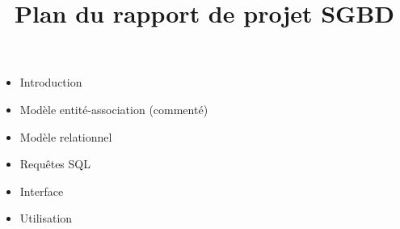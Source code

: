 \documentclass{article}
\title{Plan du rapport de projet SGBD}
\begin{document}
\maketitle
\begin{itemize}
\item Introduction
\item Modèle entité-association (commenté)
\item Modèle relationnel
\item Requêtes SQL
\item Interface
\item Utilisation
\end{itemize}
\end{document}
